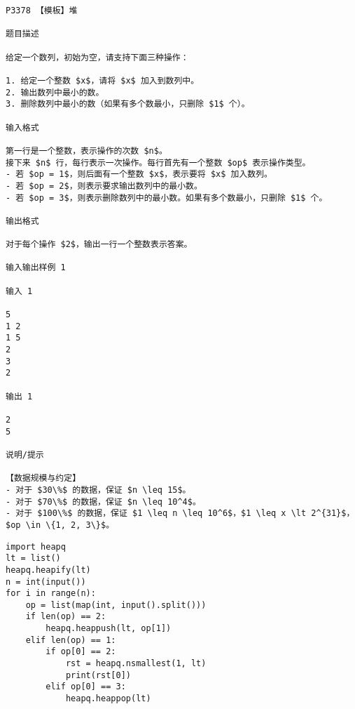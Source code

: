 \documentclass[../main]{subfiles}
\begin{document}
\begin{verbatim}
P3378 【模板】堆

题目描述

给定一个数列，初始为空，请支持下面三种操作：

1. 给定一个整数 $x$，请将 $x$ 加入到数列中。
2. 输出数列中最小的数。
3. 删除数列中最小的数（如果有多个数最小，只删除 $1$ 个）。

输入格式

第一行是一个整数，表示操作的次数 $n$。  
接下来 $n$ 行，每行表示一次操作。每行首先有一个整数 $op$ 表示操作类型。
- 若 $op = 1$，则后面有一个整数 $x$，表示要将 $x$ 加入数列。
- 若 $op = 2$，则表示要求输出数列中的最小数。
- 若 $op = 3$，则表示删除数列中的最小数。如果有多个数最小，只删除 $1$ 个。

输出格式

对于每个操作 $2$，输出一行一个整数表示答案。

输入输出样例 1

输入 1

5
1 2
1 5
2
3
2

输出 1

2
5

说明/提示

【数据规模与约定】
- 对于 $30\%$ 的数据，保证 $n \leq 15$。
- 对于 $70\%$ 的数据，保证 $n \leq 10^4$。
- 对于 $100\%$ 的数据，保证 $1 \leq n \leq 10^6$，$1 \leq x \lt 2^{31}$，$op \in \{1, 2, 3\}$。
\end{verbatim}

\begin{lstlisting}[style = Python]
import heapq
lt = list()
heapq.heapify(lt)
n = int(input())
for i in range(n):
    op = list(map(int, input().split()))
    if len(op) == 2:
        heapq.heappush(lt, op[1])
    elif len(op) == 1:
        if op[0] == 2:
            rst = heapq.nsmallest(1, lt)
            print(rst[0])
        elif op[0] == 3:
            heapq.heappop(lt)
\end{lstlisting}
\end{document}
